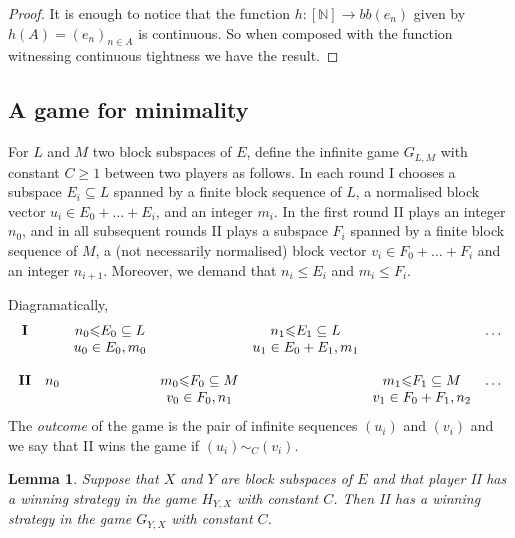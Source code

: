 \documentclass[10pt]{amsart}
\numberwithin{equation}{section}
\newtheorem{lemme}[thm]{Lemma}
\begin{document}
\begin{proof}
It is enough to notice that the function $h\colon[{\mathbb N}]{\rightarrow} bb(e_n)$ given by
$h(A)=(e_n)_{n\in A}$ is continuous. So when composed with the function
witnessing continuous tightness we have the result.
\end{proof}

\subsection{A game for minimality}
For $L$ and $M$  two block subspaces of $E$, define the infinite game $G_{L,M}$
with constant $C{\ensuremath{\geqslant}} 1$ between two players as follows. In each round I chooses
a subspace $E_i\subseteq L$ spanned by a finite block sequence of $L$, a
normalised block vector $u_i\in E_0+\ldots+E_i$, and an integer $m_i$. In the
first round II plays an integer $n_0$, and in all subsequent rounds II plays a
subspace $F_i$ spanned by a finite block sequence of $M$, a (not necessarily
normalised) block vector $v_i\in F_0+\ldots+F_i$ and an integer $n_{i+1}$.
Moreover, we demand that $n_i{\ensuremath{\leqslant}} E_i$ and $m_i{\ensuremath{\leqslant}} F_i$.

Diagramatically,
\[\begin{array}{ccccccc}
{\bf I}   &       &n_0{\ensuremath{\leqslant}} E_0 \subseteq  L &      &  n_1{\ensuremath{\leqslant}} E_1\subseteq L&     & \ldots     \\
              &       &u_0\in E_0,        m_0         &       & u_1\in E_0+E_1,  m_1          &       &      \\
              &      &               &      &            &     &            \\
{\bf II}   &n_0      &        & m_0{\ensuremath{\leqslant}} F_0 \subseteq M&       &m_1{\ensuremath{\leqslant}} F_1 \subseteq M & \ldots   \\
                       &      &           &v_0 \in F_0, n_1 &       &v_1 \in F_0+F_1, n_2&     \\
 \end{array}\]
The {\em outcome} of the game is the pair of infinite sequences $(u_i)$ and
$(v_i)$ and we say that II wins the game if $(u_i)\sim_C(v_i)$.

\begin{lemme}\label{games}
Suppose that $X$ and $Y$ are block subspaces of $E$ and that player II has a
winning strategy in the game $H_{Y,X}$ with constant $C$. Then II has a winning
strategy in the game $G_{Y,X}$ with constant $C$.
\end{lemme}
\end{document}
